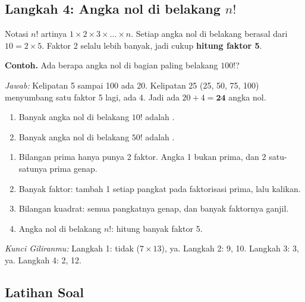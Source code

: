 \documentclass[11pt,a4paper]{article}
\begin{document}
\subsection*{Langkah 4: Angka nol di belakang $n!$}
Notasi $n!$ artinya $1 \times 2 \times 3 \times \dots \times n$. Setiap angka nol di belakang
berasal dari $10 = 2 \times 5$. Faktor 2 selalu lebih banyak, jadi cukup \textbf{hitung faktor 5}.

\begin{contoh}
\textbf{Contoh.} Ada berapa angka nol di bagian paling belakang $100!$?

\textit{Jawab:} Kelipatan 5 sampai 100 ada 20. Kelipatan 25 (25, 50, 75, 100) menyumbang satu
faktor 5 lagi, ada 4. Jadi ada $20 + 4 = \textbf{24}$ angka nol.
\end{contoh}

\begin{giliranmu}
\begin{enumerate}[label=\alph*.]
    \item Banyak angka nol di belakang $10!$ adalah \kosong.
    \item Banyak angka nol di belakang $50!$ adalah \kosong.
\end{enumerate}
\end{giliranmu}

\begin{rangkuman}
\begin{enumerate}
    \item Bilangan prima hanya punya 2 faktor. Angka 1 bukan prima, dan 2 satu-satunya prima genap.
    \item Banyak faktor: tambah 1 setiap pangkat pada faktorisasi prima, lalu kalikan.
    \item Bilangan kuadrat: semua pangkatnya genap, dan banyak faktornya ganjil.
    \item Angka nol di belakang $n!$: hitung banyak faktor 5.
\end{enumerate}
\end{rangkuman}

\textit{Kunci Giliranmu:} Langkah 1: tidak ($7 \times 13$), ya. \quad Langkah 2: 9, 10. \quad
Langkah 3: 3, ya. \quad Langkah 4: 2, 12.

\newpage
\subsection*{Latihan Soal}
\end{document}
